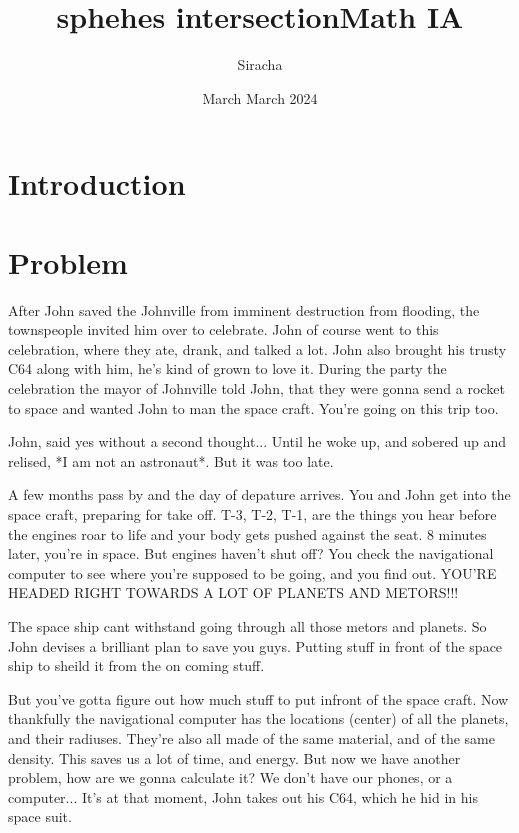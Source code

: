 \documentclass{article}
\title{sphehes intersection}
\author{Siracha}
\date{March }
\begin{document}
\maketitle

\section{Introduction}


\title{Math IA}
\author{}
\date{March 2024}


\maketitle

\section{Problem}

After John saved the Johnville from imminent destruction from flooding, the townspeople invited him over to celebrate. John of course went to this celebration, where they ate, drank, and talked a lot. John also brought his trusty C64 along with him, he's kind of grown to love it. During the party the celebration the mayor of Johnville told John, that they were gonna send a rocket to space and wanted John to man the space craft. You're going on this trip too.

John, said yes without a second thought... Until he woke up, and sobered up and relised, *I am not an astronaut*. But it was too late.

A few months pass by and the day of depature arrives. You and John get into the space craft, preparing for take off.
T-3, T-2, T-1, are the things you hear before the engines roar to life and your body gets pushed against the seat.
8 minutes later, you're in space. But engines haven't shut off? You check the navigational computer to see where you're supposed to be going, and you find out. YOU'RE HEADED RIGHT TOWARDS A LOT OF PLANETS AND METORS!!!

The space ship cant withstand going through all those metors and planets. So John devises a brilliant plan to save you guys. Putting stuff in front of the space ship to sheild it from the on coming stuff.

But you've gotta figure out how much stuff to put infront of the space craft.
Now thankfully the navigational computer has the locations (center) of all the planets, and their radiuses. They're also all made of the same material, and of the same density. This saves us a lot of time, and energy. But now we have another problem, how are we gonna calculate it? We don't have our phones, or a computer... It's at that moment, John takes out his C64, which he hid in his space suit.
\end{document}
